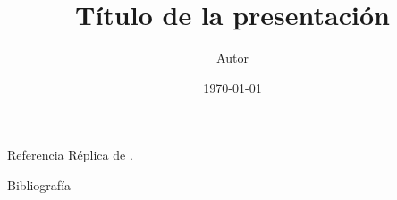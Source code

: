 \documentclass[aspectratio=169]{beamer}
\title{T\'itulo de la presentaci\'on}
\author{Autor}
\date{\today}
\begin{document}
\begin{frame}
  \titlepage
\end{frame}

\begin{frame}{Referencia}
  R\'eplica de \textcite{basso2026}.
\end{frame}

\begin{frame}[allowframebreaks]{Bibliograf\'ia}
  \printbibliography
\end{frame}
\end{document}
